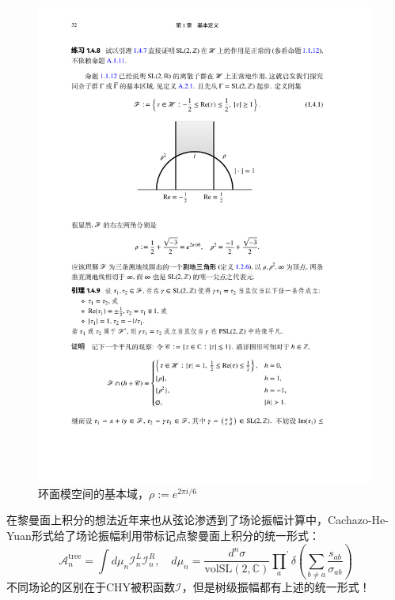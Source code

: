 \begin{figure}[htbp]
	\centering
	\includegraphics{figs/fig5.pdf}
	\caption{环面模空间的基本域，$\rho:=e^{2\pi i/6}$}
	\label{fig:5}
\end{figure}

在黎曼面上积分的想法近年来也从弦论渗透到了场论振幅计算中，Cachazo-He-Yuan形式给了场论振幅利用带标记点黎曼面上积分的统一形式\cite{Cachazo:2013iea,Cachazo:2013hca}：
\begin{equation}
	\mathcal{A}_{n}^\text{tree}=\int d\mu_{n}\mathcal{I}_{n}^L\mathcal{I}_{n}^R,\quad d\mu_{n}=\frac{d^{n}\sigma}{\mathrm{volSL}(2,\mathbb{C})}{\prod_{a}}^{\prime}\delta{\left(\sum_{b\neq a}\frac{s_{ab}}{\sigma_{ab}}\right)}
\end{equation}
不同场论的区别在于CHY被积函数$\mathcal{I}$，但是树级振幅都有上述的统一形式！
